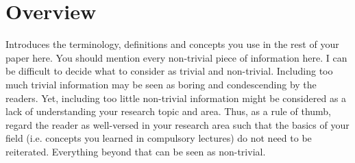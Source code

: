 \chapter{Overview}\label{ch:overview}
Introduces the terminology, definitions and concepts you use in the rest of your paper here.
You should mention every non-trivial piece of information here. 
I can be difficult to decide what to consider as trivial and non-trivial.
Including too much trivial information may be seen as boring and condescending by the readers.
Yet, including too little non-trivial information might be considered as a lack of understanding your research topic and area.
Thus, as a rule of thumb, regard the reader as well-versed in your research area such that the basics of your field (i.e. concepts you learned in compulsory lectures) do not need to be reiterated.
Everything beyond that can be seen as non-trivial.
